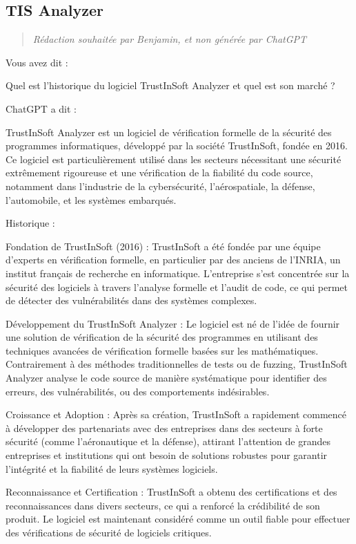 \documentclass[a4paper,11pt]{article}
\newenvironment{comment}{\begin{quote}\color{blue}\itshape}{\end{quote}}
\begin{document}
\subsection{TIS Analyzer}

\begin{comment}
  Rédaction souhaitée par Benjamin, et non générée par ChatGPT
\end{comment}

Vous avez dit :

Quel est l'historique du logiciel TrustInSoft Analyzer et quel est son marché ?

ChatGPT a dit :

TrustInSoft Analyzer est un logiciel de vérification formelle de la sécurité des
programmes informatiques, développé par la société TrustInSoft, fondée en
2016. Ce logiciel est particulièrement utilisé dans les secteurs nécessitant une
sécurité extrêmement rigoureuse et une vérification de la fiabilité du code
source, notamment dans l'industrie de la cybersécurité, l'aérospatiale, la
défense, l'automobile, et les systèmes embarqués.

Historique :

Fondation de TrustInSoft (2016) : TrustInSoft a été fondée par une équipe
d'experts en vérification formelle, en particulier par des anciens de l'INRIA,
un institut français de recherche en informatique. L'entreprise s'est concentrée
sur la sécurité des logiciels à travers l'analyse formelle et l'audit de code,
ce qui permet de détecter des vulnérabilités dans des systèmes complexes.

Développement du TrustInSoft Analyzer : Le logiciel est né de l'idée de fournir
une solution de vérification de la sécurité des programmes en utilisant des
techniques avancées de vérification formelle basées sur les
mathématiques. Contrairement à des méthodes traditionnelles de tests ou de
fuzzing, TrustInSoft Analyzer analyse le code source de manière systématique
pour identifier des erreurs, des vulnérabilités, ou des comportements
indésirables.

Croissance et Adoption : Après sa création, TrustInSoft a rapidement commencé à
développer des partenariats avec des entreprises dans des secteurs à forte
sécurité (comme l'aéronautique et la défense), attirant l'attention de grandes
entreprises et institutions qui ont besoin de solutions robustes pour garantir
l'intégrité et la fiabilité de leurs systèmes logiciels.

Reconnaissance et Certification : TrustInSoft a obtenu des certifications et des
reconnaissances dans divers secteurs, ce qui a renforcé la crédibilité de son
produit. Le logiciel est maintenant considéré comme un outil fiable pour
effectuer des vérifications de sécurité de logiciels critiques.
\end{document}
